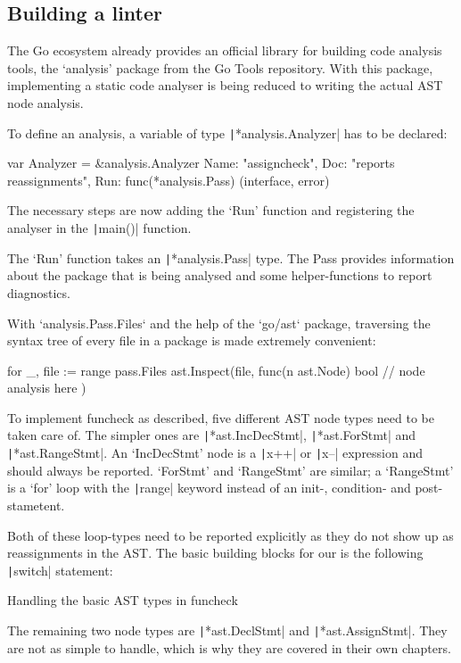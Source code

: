 \subsection{Building a linter}

The Go ecosystem already provides an official library for building code analysis tools,
the `analysis' package from the Go Tools repository\autocite{go-analysis}. With this package,
implementing a static code analyser is being reduced to writing the actual AST node analysis.

To define an analysis, a variable of type \texttt|*analysis.Analyzer| has to be declared:

\begin{gocode}
var Analyzer = &analysis.Analyzer{
	Name: "assigncheck",
	Doc:  "reports reassignments",
	Run:  func(*analysis.Pass) (interface{}, error)
}
\end{gocode}

The necessary steps are now adding the `Run' function and registering the analyser
in the \texttt|main()| function.

The `Run' function takes an \texttt|*analysis.Pass| type. The Pass provides
information about the package that is being analysed and some helper-functions to report
diagnostics.

With `analysis.Pass.Files` and the help of the `go/ast` package, traversing the syntax
tree of every file in a package is made extremely convenient:

\begin{gocode}
for _, file := range pass.Files {
	ast.Inspect(file, func(n ast.Node) bool {
		// node analysis here
	})
}
\end{gocode}

To implement funcheck as described, five different AST node types need to be
taken care of. The simpler ones are
\texttt|*ast.IncDecStmt|, \texttt|*ast.ForStmt| and \texttt|*ast.RangeStmt|.
An `IncDecStmt' node is a \texttt|x++| or \texttt|x--|
expression and should always be reported.
`ForStmt' and `RangeStmt' are similar; a `RangeStmt' is a `for' loop with the
\texttt|range| keyword instead of an init-, condition- and post-stametent.

Both of these loop-types need to be reported explicitly as they do not show up
as reassignments in the AST.
The basic building blocks for our is the following \texttt|switch|
statement:
\begin{code}
	\caption{Handling the basic AST types in funcheck}
\end{code}
The remaining two node types are \texttt|*ast.DeclStmt| and \texttt|*ast.AssignStmt|.
They are not as simple to handle, which is why they are covered in their own chapters.

